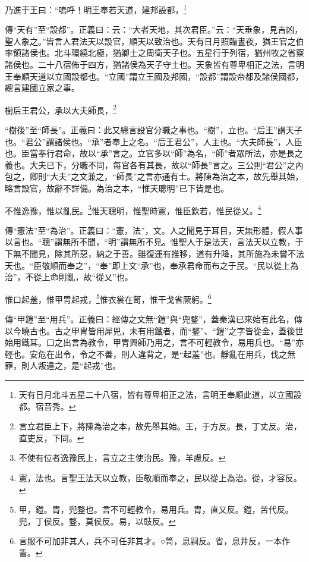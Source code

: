 乃進于王曰：“嗚呼！明王奉若天道，建邦設都，\footnote{天有日月北斗五星二十八宿，皆有尊卑相正之法，言明王奉順此道，以立國設都。宿音秀。}

{\noindent\zhuan{}\fzbyks 傳“天有”至“設都”。正義曰：云：“大者天地，其次君臣。”云：“天垂象，見吉凶，聖人象之。”皆言人君法天以設官，順天以致治也。天有日月照臨晝夜，猶王官之伯率領諸侯也。北斗環繞北極，猶卿士之周衛天子也。五星行于列宿，猶州牧之省察諸侯也。二十八宿佈于四方，猶諸侯為天子守土也。天象皆有尊卑相正之法，言明王奉順天道以立國設都也。“立國”謂立王國及邦國，“設都”謂設帝都及諸侯國都，總言建國立家之事。 \par}

樹后王君公，承以大夫師長，\footnote{言立君臣上下，將陳為治之本，故先舉其始。王，于方反。長，丁丈反。治，直吏反，下同。}

{\noindent\shu{}\fzkt “樹後”至“師長”。正義曰：此又總言設官分職之事也。“樹”，立也。“后王”謂天子也。“君公”謂諸侯也。“承”者奉上之名。“后王君公”，人主也。“大夫師長”，人臣也。臣當奉行君命，故以“承”言之。立官多以“師”為名，“師”者眾所法，亦是長之義也。大夫已下，分職不同，每官各有其長，故以“師長”言之。三公則“君公”之內包之，卿則“大夫”之文兼之，“師長”之言亦通有士。將陳為治之本，故先舉其始，略言設官，故辭不詳備。為治之本，“惟天聰明”已下皆是也。 \par}

不惟逸豫，惟以亂民。\footnote{不使有位者逸豫民上，言立之主使治民。豫，羊慮反。}惟天聰明，惟聖時憲，惟臣欽若，惟民從乂。\footnote{憲，法也。言聖王法天以立教，臣敬順而奉之，民以從上為治。從，才容反。}

{\noindent\zhuan{}\fzbyks 傳“憲法”至“為治”。正義曰：“憲，法”，文。人之聞見于耳目，天無形體，假人事以言也。“聰”謂無所不聞，“明”謂無所不見。惟聖人于是法天，言法天以立教，于下無不聞見，除其所惡，納之于善。雖復運有推移，道有升降，其所施為未嘗不法天也。“臣敬順而奉之”，“奉”即上文“承”也，奉承君命而布之于民。“民以從上為治”，不從上命則亂，故“從乂”也。 \par}

惟口起羞，惟甲冑起戎，\footnote{甲，鎧。胄，兜鍪也。言不可輕教令，易用兵。胄，直又反。鎧，苦代反。兜，丁侯反。鍪，莫侯反。易，以豉反。}惟衣裳在笥，惟干戈省厥躬。\footnote{言服不可加非其人，兵不可任非其才。○笥，息嗣反。省，息井反，一本作眚。}


{\noindent\zhuan{}\fzbyks 傳“甲鎧”至“用兵”。正義曰：經傳之文無“鎧”與“兜鍪”，蓋秦漢已來始有此名，傳以今曉古也。古之甲冑皆用犀兕，未有用鐵者，而“鍪”、“鎧”之字皆從金，蓋後世始用鐵耳。口之出言為教令，甲冑興師乃用之，言不可輕教令，易用兵也。“易”亦輕也。安危在出令，令之不善，則人違背之，是“起羞”也。靜亂在用兵，伐之無罪，則人叛違之，是“起戎”也。 \par}

